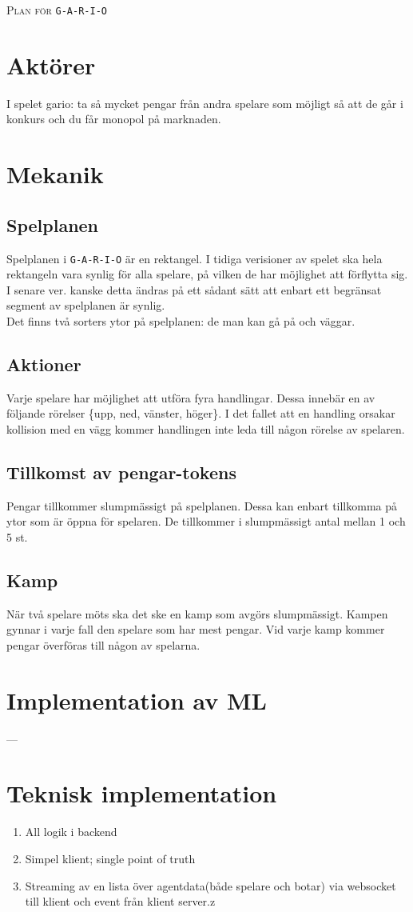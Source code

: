 \documentclass{article}
\begin{document}
    \Huge\textsc{Plan för} \texttt{G-A-R-I-O} \normalsize\\

    \section{Aktörer}
    I spelet gario: ta så mycket pengar från andra spelare som möjligt så att de går i konkurs och du får monopol på marknaden. 
    \section{Mekanik}
    \subsection{Spelplanen}
    Spelplanen i \texttt{G-A-R-I-O} är en rektangel. I tidiga verisioner av spelet ska hela rektangeln vara synlig för alla spelare, på vilken de har möjlighet att förflytta sig. I senare ver. kanske detta ändras på ett sådant sätt att enbart ett begränsat segment av spelplanen är synlig. \\

    Det finns två sorters ytor på spelplanen: de man kan gå på och väggar. 
    \subsection{Aktioner}
    Varje spelare har möjlighet att utföra fyra handlingar. Dessa innebär en av följande rörelser \{upp, ned, vänster, höger\}. I det fallet att en handling orsakar kollision med en vägg kommer handlingen inte leda till någon rörelse av spelaren. 
    \subsection{Tillkomst av pengar-tokens}
    Pengar tillkommer slumpmässigt på spelplanen. Dessa kan enbart tillkomma på ytor som är öppna för spelaren. De tillkommer i slumpmässigt antal mellan 1 och 5 st. 
    \subsection{Kamp}
    När två spelare möts ska det ske en kamp som avgörs slumpmässigt. Kampen gynnar i varje fall den spelare som har mest pengar. Vid varje kamp kommer pengar överföras till någon av spelarna.
    \section{Implementation av ML}
    ---
    \section{Teknisk implementation}
    \begin{enumerate}
        \item All logik i backend
        \item Simpel klient; single point of truth
        \item Streaming av en lista över agentdata(både spelare och botar) via websocket till klient och event från klient server.z
    \end{enumerate}
    
\end{document}
